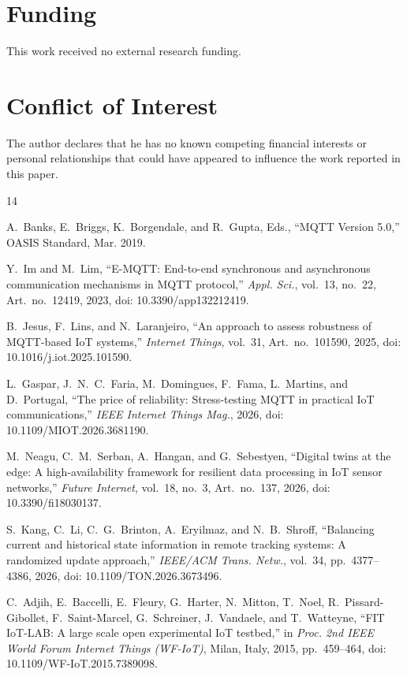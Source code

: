 \documentclass[journal]{IEEEtran}
\begin{document}
\section*{Funding}
This work received no external research funding.

\section*{Conflict of Interest}
The author declares that he has no known competing financial interests or personal relationships that could have appeared to influence the work reported in this paper.
\begin{thebibliography}{14}

A.~Banks, E.~Briggs, K.~Borgendale, and R.~Gupta, Eds.,
``MQTT Version 5.0,'' OASIS Standard, Mar. 2019.

Y.~Im and M.~Lim,
``E-MQTT: End-to-end synchronous and asynchronous communication mechanisms in MQTT protocol,''
\emph{Appl. Sci.}, vol.~13, no.~22, Art.~no.~12419, 2023,
doi: 10.3390/app132212419.

B.~Jesus, F.~Lins, and N.~Laranjeiro,
``An approach to assess robustness of MQTT-based IoT systems,''
\emph{Internet Things}, vol.~31, Art.~no.~101590, 2025,
doi: 10.1016/j.iot.2025.101590.

L.~Gaspar, J.~N.~C.~Faria, M.~Domingues, F.~Fama, L.~Martins, and D.~Portugal,
``The price of reliability: Stress-testing MQTT in practical IoT communications,''
\emph{IEEE Internet Things Mag.}, 2026,
doi: 10.1109/MIOT.2026.3681190.

M.~Neagu, C.~M.~Serban, A.~Hangan, and G.~Sebestyen,
``Digital twins at the edge: A high-availability framework for resilient data processing in IoT sensor networks,''
\emph{Future Internet}, vol.~18, no.~3, Art.~no.~137, 2026,
doi: 10.3390/fi18030137.

S.~Kang, C.~Li, C.~G.~Brinton, A.~Eryilmaz, and N.~B.~Shroff,
``Balancing current and historical state information in remote tracking systems: A randomized update approach,''
\emph{IEEE/ACM Trans. Netw.}, vol.~34, pp.~4377--4386, 2026,
doi: 10.1109/TON.2026.3673496.

C.~Adjih, E.~Baccelli, E.~Fleury, G.~Harter, N.~Mitton, T.~Noel, R.~Pissard-Gibollet, F.~Saint-Marcel, G.~Schreiner, J.~Vandaele, and T.~Watteyne,
``FIT IoT-LAB: A large scale open experimental IoT testbed,''
in \emph{Proc. 2nd IEEE World Forum Internet Things (WF-IoT)}, Milan, Italy, 2015, pp.~459--464,
doi: 10.1109/WF-IoT.2015.7389098.


\end{thebibliography}
\end{document}
